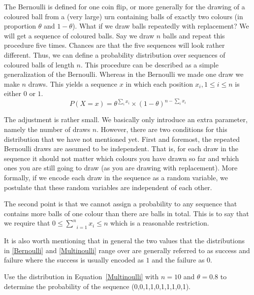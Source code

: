 The Bernoulli is defined for one coin flip, or more generally for the
drawing of a coloured ball from a (very large) urn containing balls
of exactly two colours (in proportion $\theta$ and $1-\theta$). What if we draw balls repeatedly with replacement? We will get a sequence of coloured balls. 
Say we draw $ n $ balls and repeat this procedure five times. Chances are that the five sequences will look rather different.
Thus, we can define a probability distribution over sequences of
coloured balls of length $ n $. This procedure can be described as a simple generalization
of the Bernoulli. Whereas in the Bernoulli we made one draw we make $
n $ draws. This yields a sequence $ x $ in which each position $ x_{i}, 1 \leq i \leq n $ is either $ 0 $ or $ 1 $.
\begin{equation}\label{Multinoulli}
P(X=x) = \theta^{\sum_i x_i} \times (1 - \theta)^{n-\sum_i x_i}
\end{equation}

The adjustment is rather small. We basically only introduce an extra parameter, namely the number of draws $ n $. 
However, there are two conditions for this distribution that we have not mentioned yet. First and foremost,
the repeated Bernoulli draws are assumed to be independent. That is, for each draw in the sequence it should not matter which colours you
have drawn so far and which ones you are still going to draw (as you
are drawing with replacement). More formally, if we encode each draw in the sequence as a random
variable, we postulate that these random variables are independent of each other. 

The second point is that we cannot assign a probability to any sequence that contains more balls of one colour than there are balls in total.
This is to say that we require that $ 0 \leq \underset{i=1}{\overset{n}{\sum}}x_{i} \leq n $ which is a reasonable restriction. 

It is also worth mentioning that in general the two values that the distributions in \eqref{Bernoulli} and \eqref{Multinoulli} range
over are generally referred to as success and failure where the success is usually encoded as $ 1 $ and the failure as $ 0 $. 

\begin{Exercise}
Use the distribution in Equation~\eqref{Multinoulli} with $ n = 10 $ and $ \theta = 0.8 $ to determine the probability of the sequence (0,0,1,1,0,1,1,1,0,1).
\end{Exercise}


